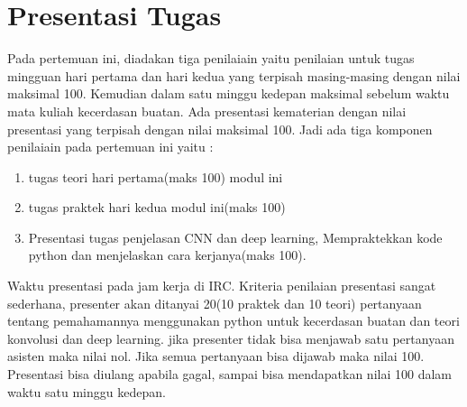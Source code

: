 \section{Presentasi Tugas}
Pada pertemuan ini, diadakan tiga penilaiain yaitu penilaian untuk tugas mingguan hari pertama dan hari kedua yang terpisah masing-masing dengan nilai maksimal 100. Kemudian dalam satu minggu kedepan maksimal sebelum waktu mata kuliah kecerdasan buatan. Ada presentasi kematerian dengan nilai presentasi yang terpisah dengan nilai maksimal 100. Jadi ada tiga komponen penilaiain pada pertemuan ini yaitu :
\begin{enumerate}
	\item tugas teori hari pertama(maks 100) modul ini
	\item tugas praktek hari kedua modul ini(maks 100)
	\item Presentasi tugas penjelasan CNN dan deep learning, Mempraktekkan kode python dan menjelaskan cara kerjanya(maks 100).
\end{enumerate}
Waktu presentasi pada jam kerja di IRC. Kriteria penilaian presentasi sangat sederhana, presenter akan ditanyai 20(10 praktek dan 10 teori) pertanyaan tentang pemahamannya menggunakan python untuk kecerdasan buatan dan teori konvolusi dan deep learning. jika presenter tidak bisa menjawab satu pertanyaan asisten maka nilai nol. Jika semua pertanyaan bisa dijawab maka nilai 100. Presentasi bisa diulang apabila gagal, sampai bisa mendapatkan nilai 100 dalam waktu satu minggu kedepan.


